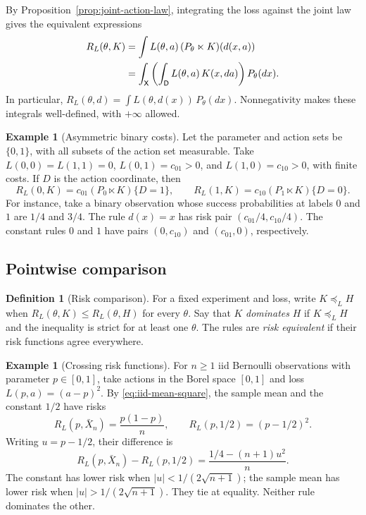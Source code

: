 \documentclass[11pt,oneside]{book}
\theoremstyle{definition}
\newtheorem{definition}[theorem]{Definition}
\newtheorem{example}[theorem]{Example}
\theoremstyle{remark}
\begin{document}
By Proposition~\ref{prop:joint-action-law}, integrating the loss against
the joint law gives the equivalent expressions
\begin{align}
R_L(\theta,K)
&=\int L(\theta,a)\,(P_\theta\ltimes K)(d(x,a)) \notag\\
&=\int_{\mathsf X}\left(\int_{\mathsf D}L(\theta,a)\,K(x,da)\right)P_\theta(dx).
\label{eq:risk-iterated}
\end{align}
In particular, $R_L(\theta,d)=\int L(\theta,d(x))\,P_\theta(dx)$.
Nonnegativity makes these integrals well-defined, with $+\infty$ allowed.

\begin{example}[Asymmetric binary costs]
\label{ex:asymmetric-binary-risk}
Let the parameter and action sets be $\{0,1\}$, with all subsets of the
action set measurable. Take $L(0,0)=L(1,1)=0$,
$L(0,1)=c_{01}>0$, and $L(1,0)=c_{10}>0$, with finite costs.
If $D$ is the action coordinate, then
\[
R_L(0,K)=c_{01}(P_0\ltimes K)\{D=1\},\qquad
R_L(1,K)=c_{10}(P_1\ltimes K)\{D=0\}.
\]
For instance, take a binary observation whose success probabilities
at labels $0$ and $1$ are $1/4$ and $3/4$. The rule $d(x)=x$ has risk
pair $(c_{01}/4,c_{10}/4)$. The constant rules $0$ and $1$ have pairs
$(0,c_{10})$ and $(c_{01},0)$, respectively.
\end{example}

\subsection{Pointwise comparison}
\label{subsec:risk-comparison}

\begin{definition}[Risk comparison]
\label{def:risk-comparison}
For a fixed experiment and loss, write $K\preceq_L H$ when
$R_L(\theta,K)\leq R_L(\theta,H)$ for every $\theta$.
Say that $K$ \emph{dominates} $H$ if $K\preceq_L H$ and the inequality
is strict for at least one $\theta$. The rules are \emph{risk equivalent}
if their risk functions agree everywhere.
\end{definition}

\begin{example}[Crossing risk functions]
\label{ex:bernoulli-crossing-risks}
For $n\geq1$ iid Bernoulli observations with parameter $p\in[0,1]$,
take actions in the Borel space $[0,1]$ and loss $L(p,a)=(a-p)^2$.
By \eqref{eq:iid-mean-square}, the sample mean and the constant $1/2$
have risks
\[
R_L(p,\bar X_n)=\frac{p(1-p)}n,\qquad
R_L(p,1/2)=(p-1/2)^2.
\]
Writing $u=p-1/2$, their difference is
\[
R_L(p,\bar X_n)-R_L(p,1/2)
=\frac{1/4-(n+1)u^2}{n}.
\]
The constant has lower risk when $|u|<1/(2\sqrt{n+1})$; the sample mean
has lower risk when $|u|>1/(2\sqrt{n+1})$. They tie at equality.
Neither rule dominates the other.
\end{example}
\end{document}
